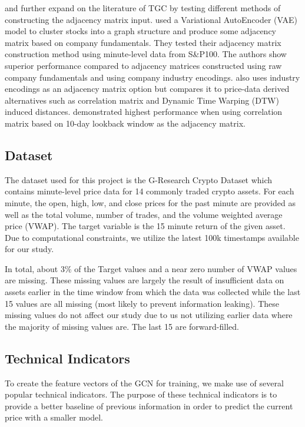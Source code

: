 \cite{Hou2021} and \cite{Peng2021} further expand on the literature of TGC by testing different methods of constructing the adjacency matrix input. \cite{Hou2021} used a Variational AutoEncoder (VAE) model to cluster stocks into a graph structure and produce some adjacency matrix based on company fundamentals. They tested their adjacency matrix construction method using minute-level data from S\&P100. The authors show superior performance compared to adjacency matrices constructed using raw company fundamentals and using company industry encodings. \cite{Peng2021} also uses industry encodings as an adjacency matrix option but compares it to price-data derived alternatives such as correlation matrix and Dynamic Time Warping (DTW) induced distances. \citeauthor{Peng2021} demonstrated highest performance when using correlation matrix based on 10-day lookback window as the adjacency matrix.

\subsection{Dataset} \label{Dataset}

The dataset used for this project is the G-Research Crypto Dataset which contains minute-level price data for 14 commonly traded crypto assets. For each minute, the open, high, low, and close prices for the past minute are provided as well as the total volume, number of trades, and the volume weighted average price (VWAP). The target variable is the 15 minute return of the given asset. Due to computational constraints, we utilize the latest 100k timestamps available for our study.

In total, about 3\% of the Target values and a near zero number of VWAP values are missing. These missing values are largely the result of insufficient data on assets earlier in the time window from which the data was collected while the last 15 values are all missing (most likely to prevent information leaking). These missing values do not affect our study due to us not utilizing earlier data where the majority of missing values are. The last 15 are forward-filled.

\subsection{Technical Indicators}

To create the feature vectors of the GCN for training, we make use of several popular technical indicators. The purpose of these technical indicators is to provide a better baseline of previous information in order to predict the current price with a smaller model.

